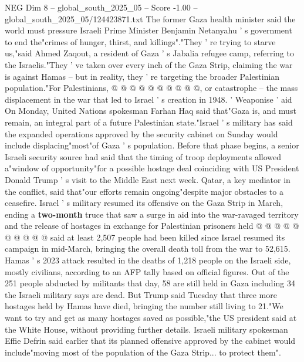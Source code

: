 \begin{textsample}{NEG Dim 8 – global\_south\_2025\_05 – Score -1.00 – global\_south\_2025\_05/124423871.txt}
The former Gaza health minister said the world must pressure Israeli Prime Minister Benjamin Netanyahu ' s government to end the"crimes of hunger, thirst, and killings"."They ' re trying to starve us,"said Ahmed Zaqout, a resident of Gaza ' s Jabalia refugee camp, referring to the Israelis."They ' ve taken over every inch of the Gaza Strip, claiming the war is against Hamas -- but in reality, they ' re targeting the broader Palestinian population."For Palestinians, @ @ @ @ @ @ @ @ @ @, or catastrophe -- the mass displacement in the war that led to Israel ' s creation in 1948. ' Weaponise ' aid On Monday, United Nations spokesman Farhan Haq said that"Gaza is, and must remain, an integral part of a future Palestinian state."Israel ' s military has said the expanded operations approved by the security cabinet on Sunday would include displacing"most"of Gaza ' s population.
Before that phase begins, a senior Israeli security source had said that the timing of troop deployments allowed a"window of opportunity"for a possible hostage deal coinciding with US President Donald Trump ' s visit to the Middle East next week.
Qatar, a key mediator in the conflict, said that"our efforts remain ongoing"despite major obstacles to a ceasefire.
Israel ' s military resumed its offensive on the Gaza Strip in March, ending a \textbf{two-month} truce that saw a surge in aid into the war-ravaged territory and the release of hostages in exchange for Palestinian prisoners held @ @ @ @ @ @ @ @ @ @ said at least 2,507 people had been killed since Israel resumed its campaign in mid-March, bringing the overall death toll from the war to 52,615.
Hamas ' s 2023 attack resulted in the deaths of 1,218 people on the Israeli side, mostly civilians, according to an AFP tally based on official figures.
Out of the 251 people abducted by militants that day, 58 are still held in Gaza including 34 the Israeli military says are dead.
But Trump said Tuesday that three more hostages held by Hamas have died, bringing the number still living to 21."We want to try and get as many hostages saved as possible,"the US president said at the White House, without providing further details.
Israeli military spokesman Effie Defrin said earlier that its planned offensive approved by the cabinet would include"moving most of the population of the Gaza Strip... to protect them".

\end{textsample}
